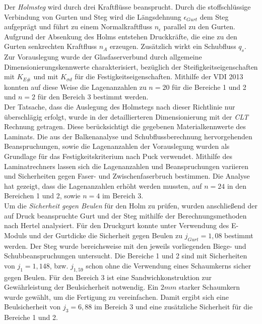 \noindent Der \textit{Holmsteg} wird durch drei Kraftflüsse beansprucht. Durch die stoffschlüssige Verbindung von Gurten und Steg wird die Längsdehnung $ \epsilon_{Gurt} $ dem Steg aufgeprägt und führt zu einem Normalkraftfluss $ n_{\epsilon} $ parallel zu den Gurten. Aufgrund der Absenkung des Holms entstehen Druckkräfte, die eine zu den Gurten senkrechten Kraftfluss $ n_{A} $ erzeugen. Zusätzlich wirkt ein Schubfluss $ q_{s} $. Zur Vorauslegung wurde der Glasfaserverbund durch allgemeine Dimensionierungskennwerte charakterisiert, bezüglich der Steifigkeitseigenschaften mit $ K_{E\#} $ und mit $ K_{\sigma d} $ für die Festigkeitseigenschaften. Mithilfe der VDI 2013 konnten auf diese Weise die Lagenanzahlen zu $ n=20 $ für die Bereiche 1 und 2 und $ n=2 $ für den Bereich 3 bestimmt werden.\\

\noindent Der Tatsache, dass die Auslegung des Holmstegs nach dieser Richtlinie nur überschlägig erfolgt, wurde in der detaillierteren Dimensionierung mit der \textit{CLT} Rechnung getragen. Diese berücksichtigt die gegebenen Materialkennwerte des Laminats. Die aus der Balkenanalyse und Schubflussberechnung hervorgehenden Beanspruchungen, sowie die Lagenanzahlen der Vorauslegung wurden als Grundlage für das Festigkeitskriterium nach Puck verwendet. Mithilfe des Laminatrechners lassen sich die Lagenanzahlen und Beanspruchungen variieren und Sicherheiten gegen Faser- und Zwischenfaserbruch bestimmen. Die Analyse hat gezeigt, dass die Lagenanzahlen erhöht werden mussten, auf $ n=24 $ in den Bereichen 1 und 2, sowie $ n=4 $ im Bereich 3.\\

\noindent Um die \textit{Sicherheit gegen Beulen} für den Holm zu prüfen, wurden anschließend der auf Druck beanspruchte Gurt und der Steg mithilfe der Berechnungsmethoden nach Hertel analysiert. Für den Druckgurt konnte unter Verwendung des E-Moduls und der Gurtdicke die Sicherheit gegen Beulen zu $ j_{Gurt}=1,08 $ bestimmt werden. Der Steg wurde bereichsweise mit den jeweils vorliegenden Biege- und Schubbeanspruchungen untersucht. Die Bereiche 1 und 2 sind mit Sicherheiten von $ j_{1}=1,148 $, bzw. $ j_{1,59} $ schon ohne die Verwendung eines Schaumkerns sicher gegen Beulen. Für den Bereich 3 ist eine Sandwichkonstruktion zur Gewährleistung der Beulsicherheit notwendig. Ein $ 2mm $ starker Schaumkern wurde gewählt, um die Fertigung zu vereinfachen. Damit ergibt sich eine Beulsicherheit von $ j_{3}=6,88 $ im Bereich 3 und eine zusätzliche Sicherheit für die Bereiche 1 und 2.\\

